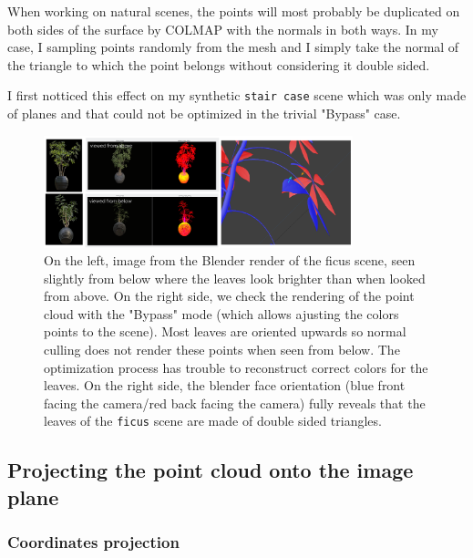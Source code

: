 When working on natural scenes, the points will most probably be duplicated on both sides of the surface by COLMAP with the normals in both ways. In my case, I sampling points randomly from the mesh and I simply take the normal of the triangle to which the point belongs without considering it double sided.

I first notticed this effect on my synthetic \texttt{stair case} scene which was only made of planes and that could not be optimized in the trivial "Bypass" case.

\begin{figure}
    \centering
    \includegraphics[width=0.8\textwidth]{figures/double_sided_surfaces_issues.png}
    \caption{On the left, image from the Blender render of the ficus scene, seen slightly from below where the leaves look brighter than when looked from above. On the right side, we check the rendering of the point cloud with the "Bypass" mode (which allows ajusting the colors points to the scene). Most leaves are oriented upwards so normal culling does not render these points when seen from below. The optimization process has trouble to reconstruct correct colors for the leaves. On the right side, the blender face orientation (blue front facing the camera/red back facing the camera) fully reveals that the leaves of the \texttt{ficus} scene are made of double sided triangles.}
    \label{fig:ficus_culling_issue}
\end{figure}

\subsection{Projecting the point cloud onto the image plane}
\label{sec:projecting_the_point_cloud_onto_the_image_plane}

\subsubsection{Coordinates projection}
\label{sec:coordinates_projection}

